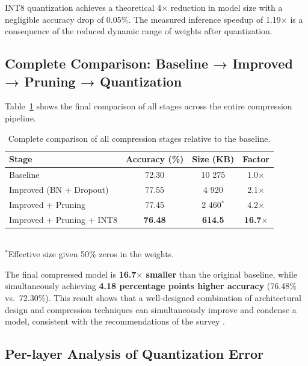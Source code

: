\documentclass[letterpaper, 10 pt, conference]{ieeeconf}
\begin{document}
INT8 quantization achieves a theoretical 4$\times$ reduction in model size with a negligible accuracy drop of 0.05\%.
The measured inference speedup of 1.19$\times$ is a consequence of the reduced dynamic range of weights after quantization.

\subsection{Complete Comparison: Baseline → Improved → Pruning → Quantization}

Table~\ref{tab:full_pipeline} shows the final comparison of all stages across the entire compression pipeline.

\begin{table}[h]
\caption{Complete comparison of all compression stages relative to the baseline.}
\label{tab:full_pipeline}
\begin{center}
\footnotesize
\begin{tabular}{lccc}
\toprule
\textbf{Stage} & \textbf{Accuracy (\%)} & \textbf{Size (KB)} & \textbf{Factor} \\
\midrule
Baseline                     & 72.30 & 10 275 & 1.0$\times$ \\
Improved (BN + Dropout)      & 77.55 & 4 920  & 2.1$\times$ \\
Improved + Pruning           & 77.45 & 2 460$^{*}$ & 4.2$\times$ \\
Improved + Pruning + INT8    & \textbf{76.48} & \textbf{614.5} & \textbf{16.7$\times$} \\
\bottomrule
\end{tabular}
\\[2pt]
{\scriptsize $^{*}$Effective size given 50\% zeros in the weights.}
\end{center}
\end{table}

The final compressed model is \textbf{16.7$\times$ smaller} than the original baseline, while simultaneously achieving \textbf{4.18 percentage points higher accuracy} (76.48\% vs.\ 72.30\%).
This result shows that a well-designed combination of architectural design and compression techniques can simultaneously improve and condense a model, consistent with the recommendations of the survey \cite{li2023survey}.

\subsection{Per-layer Analysis of Quantization Error}
\end{document}
